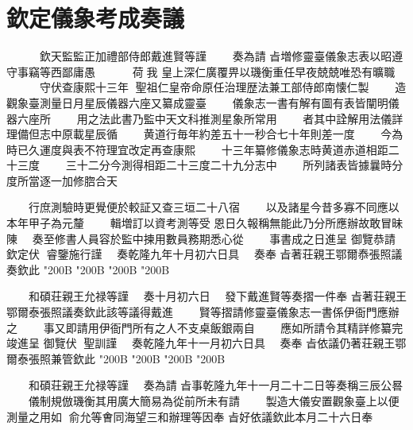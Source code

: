 \chapter*{欽定儀象考成奏議}
\begin{正文}
　　　欽天監監正加禮部侍郎戴進賢等謹
　　奏為請
㫖増修靈臺儀象志表以昭遵守事竊等西鄙庸愚
　　　荷𫎇我
皇上深仁廣覆畀以璣衡重任早夜兢兢唯恐有曠職
　　　守伏查康熙十三年𫎇
聖祖仁皇帝命原任治理歴法兼工部侍郎南懐仁製
　　造觀象臺測量日月星辰儀器六座又纂成靈臺
　　儀象志一書有解有圖有表皆闡明儀器六座所
　　用之法此書乃監中天文科推測星象所常用
　　者其中詮解用法儀詳理備但志中原載星辰循
　　黄道行毎年約差五十一秒合七十年則差一度
　　今為時已久運度與表不符理宜改定再查康熙
　　十三年纂修儀象志時黄道赤道相距二十三度
　　三十二分今測得相距二十三度二十九分志中
　　所列諸表皆據曩時分度所當逐一加修脗合天
\par
　　行庶測驗時更覺便於較証又查三垣二十八宿
　　以及諸星今昔多寡不同應以本年甲子為元釐
　　輯増訂以資考測等受
恩日久報稱無能此乃分所應辦故敢冒昧陳
　奏至修書人員容於監中揀用數員務期悉心從
　　事書成之日進呈
御覽恭請
欽定伏𠉀
睿鑒施行謹
　奏乾隆九年十月初六日具
　奏奉
㫖著荘親王鄂爾㤗張照議奏欽此
\char"200B\relax{}
\char"200B\relax{}
\char"200B\relax{}
\char"200B\relax
\par
　　和碩荘親王允禄等謹
　奏十月初六日
　發下戴進賢等奏摺一件奉
㫖著荘親王鄂爾泰張照議奏欽此該等議得戴進
　　賢等摺請修靈臺儀象志一書係伊衙門應辦之
　　事又即請用伊衙門所有之人不支桌飯銀兩自
　　應如所請令其精詳修纂完竣進呈
御覽伏𠉀
聖訓謹
　奏乾隆九年十一月初六日具
　奏奉
㫖依議仍著荘親王鄂爾泰張照兼管欽此
\char"200B\relax{}
\char"200B\relax{}
\char"200B\relax{}
\char"200B\relax
\par
　　和碩荘親王允禄等謹
　奏為請
㫖事乾隆九年十一月二十二日等奏稱三辰公晷
　　儀制規倣璣衡其用廣大簡易為從前所未有請
　　製造大儀安置觀象臺上以便測量之用如𫎇
俞允等㑹同海望三和辦理等因奉
㫖好依議欽此本月二十六日奉

\end{正文}
